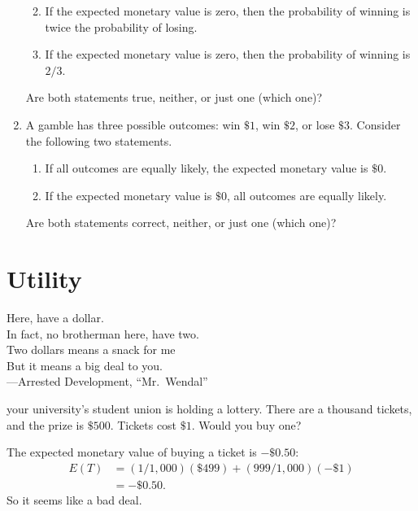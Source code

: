 \documentclass[justified]{tufte-book}
\providecommand{\tightlist}{%
  \setlength{\itemsep}{0pt}\setlength{\parskip}{0pt}}
\newcommand{\E}{E}
\newenvironment{epigraph}%
{
\begin{flushright}    
\begin{minipage}{20em}
\begin{flushright}
\itshape
}%
{
\end{flushright}
\end{minipage}
\end{flushright}
}
\theoremstyle{definition}
\theoremstyle{definition}
\theoremstyle{definition}
\theoremstyle{definition}
\theoremstyle{remark}
\begin{document}
\begin{enumerate}
  \begin{enumerate}
  \def\labelenumii{\roman{enumii}.}
  \tightlist
  \item
    If the expected monetary value is zero, then the probability of winning is twice the probability of losing.
  \item
    If the expected monetary value is zero, then the probability of winning is \(2/3\).
  \end{enumerate}

  Are both statements true, neither, or just one (which one)?
\item
  A gamble has three possible outcomes: win \(\$1\), win \(\$2\), or lose \(\$3\). Consider the following two statements.

  \begin{enumerate}
  \def\labelenumii{\roman{enumii}.}
  \tightlist
  \item
    If all outcomes are equally likely, the expected monetary value is \(\$0\).
  \item
    If the expected monetary value is \(\$0\), all outcomes are equally likely.
  \end{enumerate}

  Are both statements correct, neither, or just one (which one)?
\end{enumerate}

\hypertarget{utility}{%
\chapter{Utility}\label{utility}}

\begin{epigraph}
Here, have a dollar.\\
In fact, no brotherman here, have two.\\
Two dollars means a snack for me\\
But it means a big deal to you.\\
---Arrested Development, ``Mr.~Wendal''
\end{epigraph}

 your university's student union is holding a lottery. There are a thousand tickets, and the prize is \(\$500\). Tickets cost \(\$1\). Would you buy one?

The expected monetary value of buying a ticket is \(-\$0.50\):
\[
  \begin{aligned}
    \E(T) &= (1/1,000)(\$499) + (999/1,000)(-\$1)\\
          &= -\$0.50.
  \end{aligned}
\]
So it seems like a bad deal.
\end{document}
